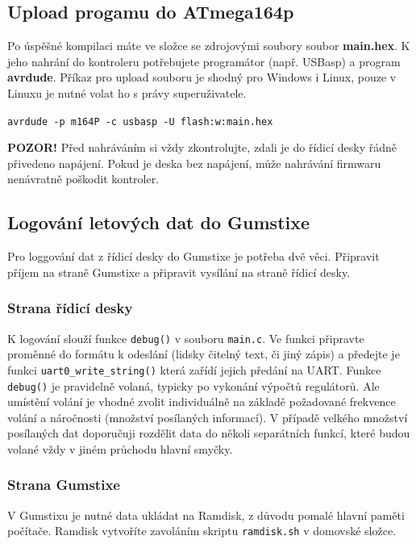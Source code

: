 \documentclass[11pt, a4paper]{article}
\begin{document}
\subsection{Upload progamu do ATmega164p}

Po úspěšné kompilaci máte ve složce se zdrojovými soubory soubor \textbf{main.hex}. K jeho nahrání do kontroleru potřebujete programátor (např. USBasp) a program \textbf{avrdude}. Příkaz pro upload souboru je shodný pro Windows i Linux, pouze v Linuxu je nutné volat ho s právy superuživatele.

\texttt{avrdude -p m164P -c usbasp -U flash:w:main.hex}

\textbf{POZOR!} Před nahráváním si vždy zkontrolujte, zdali je do řídicí desky řádně přivedeno napájení. Pokud je deska bez napájení, může nahrávání firmwaru nenávratně poškodit kontroler.

\subsection{Logování letových dat do Gumstixe}\label{chap:logovani-gumstix}

Pro loggování dat z řídicí desky do Gumstixe je potřeba dvě věci. Připravit příjem na straně Gumstixe a připravit vysílání na straně řídicí desky.

\subsubsection{Strana řídicí desky}

K logování slouží funkce \texttt{debug()} v souboru \texttt{main.c}. Ve funkci připravte proměnné do formátu k odeslání (lidsky čitelný text, či jiný zápis) a předejte je funkci \texttt{uart0\_write\_string()} která zařídí jejich předání na UART. Funkce \texttt{debug()} je pravidelně volaná, typicky po vykonání výpočtů regulátorů. Ale umístění volání je vhodné zvolit individuálně na základě požadované frekvence volání a náročnosti (množství posílaných informací). V případě velkého množství posílaných dat doporučuji rozdělit data do několi separátních funkcí, které budou volané vždy v jiném průchodu hlavní smyčky.

\subsubsection{Strana Gumstixe}

V Gumstixu je nutné data ukládat na Ramdisk, z důvodu pomalé hlavní paměti počítače. Ramdisk vytvoříte zavoláním skriptu \texttt{ramdisk.sh} v domovské složce.
\end{document}
